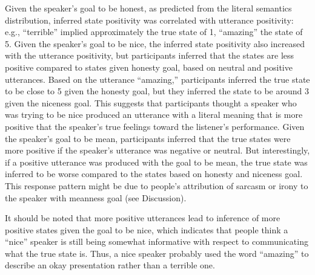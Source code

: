 \documentclass[10pt,letterpaper]{article}
\newcommand{\ndg}[1]{\textcolor{Green}{[ndg: #1]}}
\begin{document}
Given the speaker's goal to be honest, as predicted from the literal semantics distribution, inferred state positivity was correlated with utterance positivity: e.g., ``terrible'' implied approximately the true state of 1, ``amazing'' the state of 5. %
Given the speaker's goal to be nice, the inferred state positivity also increased with the utterance positivity, but participants inferred that the states are less positive compared to states given honesty goal, based on neutral and positive utterances. Based on the utterance ``amazing,'' participants inferred the true state to be close to 5 given the honesty goal, but they inferred the state to be around 3 given the niceness goal. This suggests that participants thought a speaker who was trying to be nice produced an utterance  with a literal meaning that is more positive that the speaker's true feelings toward the listener's performance.
Given the speaker's goal to be mean, participants inferred that the true states were more positive if the speaker's utterance was negative or neutral. 
But interestingly, if a positive utterance was produced with the goal to be mean, the true state was inferred to be worse compared to the states based on honesty and niceness goal. 
This response pattern might be due to people's attribution of sarcasm or irony to the speaker with meanness goal (see Discussion).

It should be noted that more positive utterances lead to inference of more positive states given the goal to be nice, which indicates that people think a ``nice'' speaker is still being somewhat informative with respect to communicating what the true state is. Thus, a nice speaker probably used the word ``amazing'' to describe an okay presentation rather than a terrible one.
\end{document}
